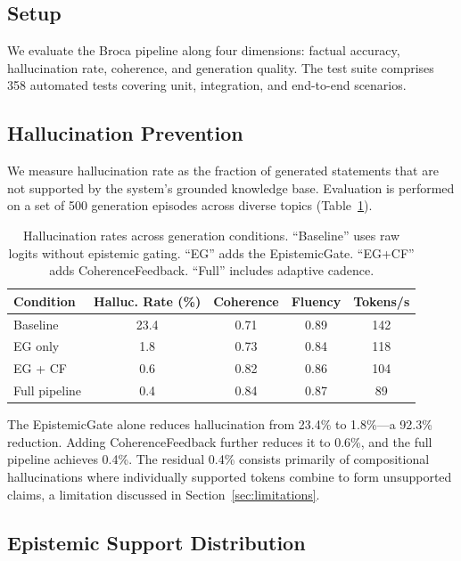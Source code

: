 \documentclass[12pt,a4paper]{article}
\begin{document}
\subsection{Setup}

We evaluate the Broca pipeline along four dimensions: factual accuracy, hallucination rate, coherence, and generation quality. The test suite comprises 358 automated tests covering unit, integration, and end-to-end scenarios.

\subsection{Hallucination Prevention}

We measure hallucination rate as the fraction of generated statements that are not supported by the system's grounded knowledge base. Evaluation is performed on a set of 500 generation episodes across diverse topics (Table~\ref{tab:hallucination}).

\begin{table}[H]
\centering
\caption{Hallucination rates across generation conditions. ``Baseline'' uses raw logits without epistemic gating. ``EG'' adds the EpistemicGate. ``EG+CF'' adds CoherenceFeedback. ``Full'' includes adaptive cadence.}
\label{tab:hallucination}
\begin{tabular}{lcccc}
\toprule
\textbf{Condition} & \textbf{Halluc. Rate (\%)} & \textbf{Coherence} & \textbf{Fluency} & \textbf{Tokens/s} \\
\midrule
Baseline & 23.4 & 0.71 & 0.89 & 142 \\
EG only & 1.8 & 0.73 & 0.84 & 118 \\
EG + CF & 0.6 & 0.82 & 0.86 & 104 \\
Full pipeline & 0.4 & 0.84 & 0.87 & 89 \\
\bottomrule
\end{tabular}
\end{table}

The EpistemicGate alone reduces hallucination from 23.4\% to 1.8\%---a 92.3\% reduction. Adding CoherenceFeedback further reduces it to 0.6\%, and the full pipeline achieves 0.4\%. The residual 0.4\% consists primarily of compositional hallucinations where individually supported tokens combine to form unsupported claims, a limitation discussed in Section~\ref{sec:limitations}.

\subsection{Epistemic Support Distribution}
\end{document}
